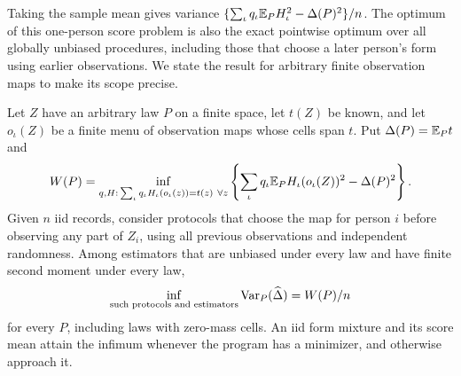 Taking the sample mean gives variance $\{\sum_\iota q_\iota\mathbb{E}_P H_\iota^2-\Delta(P)^2\}/n$. The optimum of this one-person score problem is also the exact pointwise optimum over all globally unbiased procedures, including those that choose a later person's form using earlier observations. We state the result for arbitrary finite observation maps to make its scope precise.

\begin{proposition}\label{prop:pointwise}
Let $Z$ have an arbitrary law $P$ on a finite space, let $t(Z)$ be known, and let $o_\iota(Z)$ be a finite menu of observation maps whose cells span $t$. Put $\Delta(P)=\mathbb{E}_P t$ and
\begin{equation}
 W(P)=\inf_{q,H:\,\sum_\iota q_\iota H_\iota(o_\iota(z))=t(z)\ \forall z}
       \left\{\sum_\iota q_\iota\mathbb{E}_P H_\iota(o_\iota(Z))^2-\Delta(P)^2\right\}.
 \label{eq:pointwiseoracle}
\end{equation}
Given $n$ iid records, consider protocols that choose the map for person $i$ before observing any part of $Z_i$, using all previous observations and independent randomness. Among estimators that are unbiased under every law and have finite second moment under every law,
\[
       \inf_{\text{such protocols and estimators}}\operatorname{Var}_P(\widehat\Delta)
          =W(P)/n
\]
for every $P$, including laws with zero-mass cells. An iid form mixture and its score mean attain the infimum whenever the program has a minimizer, and otherwise approach it.
\end{proposition}

